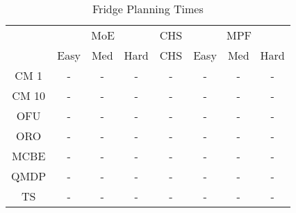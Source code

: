 \begin{table}[]
\centering
\begin{tabular}{|c|c|c|c|c|c|c|c|}
\hline
& \multicolumn{3}{c|}{MoE} & CHS & \multicolumn{3}{c|}{MPF} 
 \\ 
 & Easy & Med & Hard & CHS & Easy & Med & Hard\\\hline
CM 1 & - & - & - & - & - & - & -\\
\hline
CM 10 & - & - & - & - & - & - & -\\
\hline
OFU & - & - & - & - & - & - & -\\
\hline
ORO & - & - & - & - & - & - & -\\
\hline
MCBE & - & - & - & - & - & - & -\\
\hline
QMDP & - & - & - & - & - & - & -\\
\hline
TS & - & - & - & - & - & - & -\\
\hline
\end{tabular}
\caption{Fridge Planning Times}
\label{tab:experiment_Fridge_time}
\end{table}
